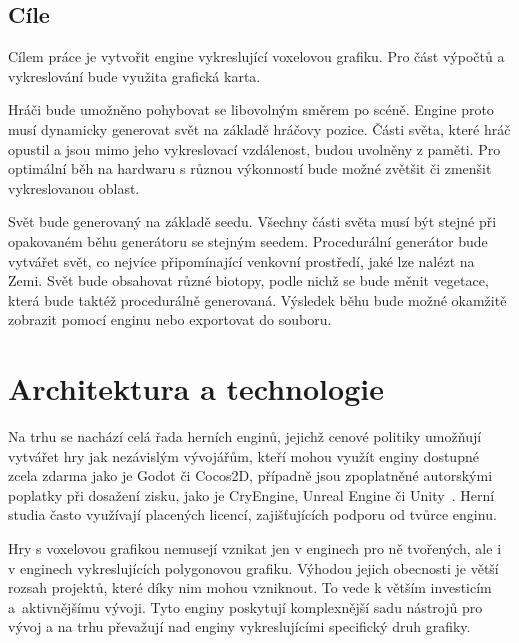\documentclass[thesis=M,czech]{FITthesis}[2019/12/23]
\begin{document}
\begin{introduction}
\section{Cíle}

Cílem práce je vytvořit engine vykreslující voxelovou grafiku. Pro část výpoč\-tů a vykreslování bude využita grafická karta.

Hráči bude umožněno pohybovat se libovolným směrem po scéně. Engine proto musí dynamicky generovat svět na základě hráčovy pozice. Části světa, které hráč opustil a jsou mimo jeho vykreslovací vzdálenost, budou uvolněny z paměti. Pro optimální běh na hardwaru s různou výkonností bude možné zvětšit či zmenšit vykreslovanou oblast.

Svět bude generovaný na základě seedu. Všechny části světa musí být stejné při opakovaném běhu generátoru se stejným seedem. Procedurální generátor bude vytvářet svět, co nejvíce připomínající venkovní prostředí, jaké lze nalézt na Zemi. Svět bude obsahovat různé biotopy, podle nichž se bude měnit vegetace, která bude taktéž procedurálně generovaná. Výsledek běhu bude možné okamžitě zobrazit pomocí enginu nebo exportovat do souboru.

\end{introduction}


\chapter{Architektura a technologie}

Na trhu se nachází celá řada herních enginů, jejichž cenové politiky umožňují vytvářet hry jak nezávislým vývojářům, kteří mohou využít enginy dostupné zcela zdarma jako je Godot či Cocos2D, případně jsou zpoplatněné autorskými poplatky při dosažení zisku, jako je CryEngine, Unreal Engine či Unity~\cite{engines}. Herní studia často využívají placených licencí, zajišťujících podporu od tvůrce enginu.

Hry s voxelovou grafikou nemusejí vznikat jen v enginech pro ně tvořených, ale i v enginech vykreslujících polygonovou grafiku. Výhodou jejich obecnosti je větší rozsah projektů, které díky nim mohou vzniknout. To vede k větším investicím a~aktivnějšímu vývoji. Tyto enginy poskytují komplexnější sadu nástrojů pro vývoj a na trhu převažují nad enginy vykreslujícími specifický druh grafiky.
\end{document}
